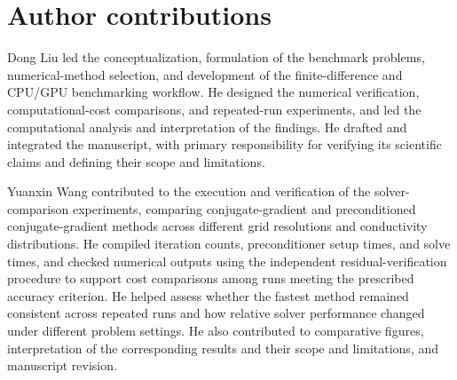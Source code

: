 \documentclass[10pt]{article}
\begin{document}
\section*{Author contributions}
Dong Liu led the conceptualization, formulation of the benchmark problems, numerical-method selection, and development of the finite-difference and CPU/GPU benchmarking workflow. He designed the numerical verification, computational-cost comparisons, and repeated-run experiments, and led the computational analysis and interpretation of the findings. He drafted and integrated the manuscript, with primary responsibility for verifying its scientific claims and defining their scope and limitations.\par
Yuanxin Wang contributed to the execution and verification of the solver-comparison experiments, comparing conjugate-gradient and preconditioned conjugate-gradient methods across different grid resolutions and conductivity distributions. He compiled iteration counts, preconditioner setup times, and solve times, and checked numerical outputs using the independent residual-verification procedure to support cost comparisons among runs meeting the prescribed accuracy criterion. He helped assess whether the fastest method remained consistent across repeated runs and how relative solver performance changed under different problem settings. He also contributed to comparative figures, interpretation of the corresponding results and their scope and limitations, and manuscript revision.\par
\end{document}
